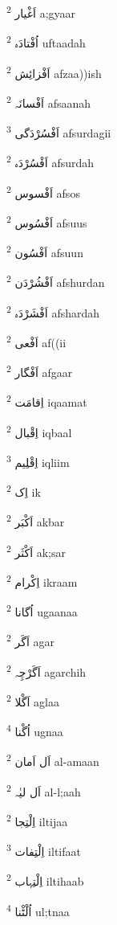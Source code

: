 \documentclass[12pt]{article}
\begin{document}
\begin{multicols}{5}
{\ur اَغْیار}   \textsuperscript{2} a;gyaar

{\ur اُفْتادَہ}   \textsuperscript{2} uftaadah

{\ur اَفْزائِش}   \textsuperscript{2} afzaa))ish

{\ur اَفْسانَہ}   \textsuperscript{2} afsaanah

{\ur اَفْسُرْدَگی}   \textsuperscript{3} afsurdagii

{\ur اَفْسُرْدَہ}   \textsuperscript{2} afsurdah

{\ur اَفْسوس}   \textsuperscript{2} afsos

{\ur اَفْسُوس}   \textsuperscript{2} afsuus

{\ur اَفْسُون}   \textsuperscript{2} afsuun

{\ur اَفْشُرْدَن}   \textsuperscript{2} afshurdan

{\ur اَفْشَرْدَہ}   \textsuperscript{2} afshardah

{\ur اَفْعی}   \textsuperscript{2} af((ii

{\ur اَفْگار}   \textsuperscript{2} afgaar

{\ur اِقامَت}   \textsuperscript{2} iqaamat

{\ur اِقْبال}   \textsuperscript{2} iqbaal

{\ur اِقْلِیم}   \textsuperscript{3} iqliim

{\ur اِک}   \textsuperscript{2} ik

{\ur اَکْبَر}   \textsuperscript{2} akbar

{\ur اَکْثَر}   \textsuperscript{2} ak;sar

{\ur اِکْرام}   \textsuperscript{2} ikraam

{\ur اُگانا}   \textsuperscript{2} ugaanaa

{\ur اَگَر}   \textsuperscript{2} agar

{\ur اَگَرْچِہ}   \textsuperscript{2} agarchih

{\ur اَگْلا}   \textsuperscript{2} aglaa

{\ur اُگْنا}   \textsuperscript{4} ugnaa

{\ur اَل اَمان}   \textsuperscript{2} al-amaan

{\ur اَل لیٰہ}   \textsuperscript{2} al-l;aah

{\ur اِلْتِجا}   \textsuperscript{2} iltijaa

{\ur اِلْتِفات}   \textsuperscript{3} iltifaat

{\ur اِلْتِہاب}   \textsuperscript{2} iltihaab

{\ur اُلْٹْنا}   \textsuperscript{4} ul;tnaa


\end{multicols}
\end{document}
